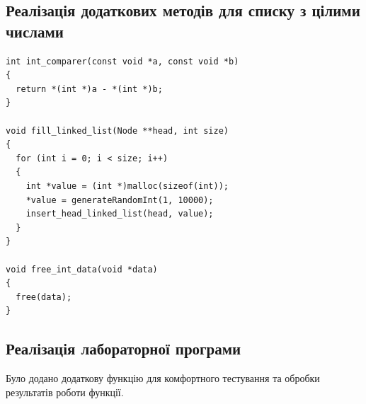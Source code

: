 \clearpage
\subsection{Реалізація додаткових методів для списку з цілими числами}
\begin{lstlisting}[style=customc]
int int_comparer(const void *a, const void *b)
{
  return *(int *)a - *(int *)b;
}

void fill_linked_list(Node **head, int size)
{
  for (int i = 0; i < size; i++)
  {
    int *value = (int *)malloc(sizeof(int));
    *value = generateRandomInt(1, 10000);
    insert_head_linked_list(head, value);
  }
}

void free_int_data(void *data)
{
  free(data);
}
\end{lstlisting}

\subsection{Реалізація лабораторної програми}
Було додано додаткову функцію для комфортного тестування та обробки результатів роботи функції.

